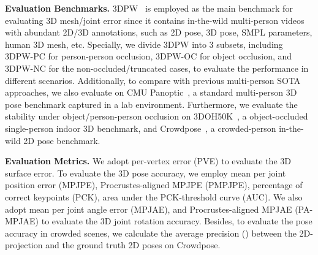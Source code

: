 \documentclass[10pt,twocolumn,letterpaper]{article}
\begin{document}
\textbf{Evaluation Benchmarks.} 
3DPW~\cite{3dpw} is employed as the main benchmark for evaluating 3D mesh/joint error since it contains in-the-wild multi-person videos with abundant 2D/3D annotations, such as 2D pose, 3D pose, SMPL parameters, human 3D mesh, etc.
Specially, we divide 3DPW into 3 subsets, including 3DPW-PC for person-person occlusion, 3DPW-OC for object occlusion, and 3DPW-NC for the non-occluded/truncated cases, to evaluate the performance in different scenarios.
Additionally, to compare with previous multi-person SOTA approaches, we also evaluate on CMU Panoptic~\cite{cmu_panoptic}, a standard multi-person 3D pose benchmark captured in a lab environment. 
Furthermore, we evaluate the stability under object/person-person occlusion on 3DOH50K~\cite{zhang2020object}, a object-occluded single-person indoor 3D benchmark, and Crowdpose~\cite{crowdpose}, a crowded-person in-the-wild 2D pose benchmark.

\textbf{Evaluation Metrics.}
We adopt per-vertex error (PVE) to evaluate the 3D surface error.
To evaluate the 3D pose accuracy, we employ mean per joint position error (MPJPE), Procrustes-aligned MPJPE (PMPJPE), percentage of correct keypoints (PCK), area under the PCK-threshold curve (AUC).
We also adopt mean per joint angle error (MPJAE), and Procrustes-aligned MPJAE (PA-MPJAE) to evaluate the 3D joint rotation accuracy. 
Besides, to evaluate the pose accuracy in crowded scenes, we calculate the average precision () between the 2D-projection  and the ground truth 2D poses on Crowdpose.

\begin{table}
    \vspace{-6mm}
\end{table}
\end{document}
